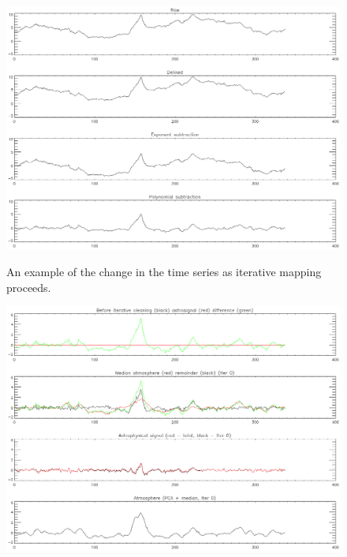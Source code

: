 \documentclass[12pt,preprint]{aastex}
\begin{document}
\setcounter{subfig}{1}
\renewcommand{\thefigure}{\arabic{figure}\alph{subfig}}

\begin{figure}
  \begin{minipage}{6.5in}
    \begin{center}
      \includegraphics[scale=0.9]{iterative_mapping1}
      \caption{An example of the change in the time series as
      iterative mapping proceeds.}
    \end{center}
    \label{fig:IterativeMapping}
  \end{minipage}
\end{figure}

\addtocounter{figure}{-1}
\addtocounter{subfig}{1}

  
\begin{figure}
  \begin{minipage}{6.5in}
    \begin{center}
      \includegraphics[scale=0.9]{iterative_mapping2}
      \caption{}
    \end{center}
    \label{fig:IterativeMapping-b}
  \end{minipage}
\end{figure}
\end{document}
